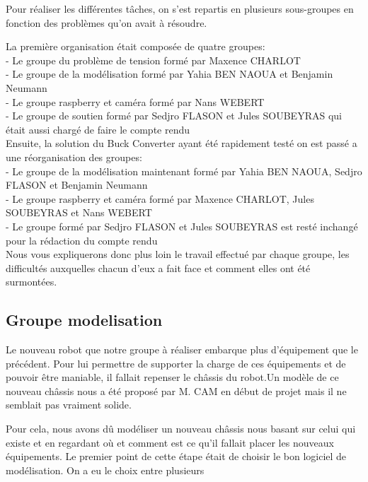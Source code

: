 \documentclass{PackagerQualityN}
\begin{document}
Pour réaliser les différentes tâches, on s'est repartis en plusieurs sous-groupes en fonction des problèmes qu'on avait à résoudre.

La première organisation était composée de quatre groupes:\\
- Le groupe du problème de tension formé par Maxence CHARLOT\\
- Le groupe de la modélisation formé par Yahia BEN NAOUA et Benjamin Neumann\\
- Le groupe raspberry et caméra formé par Nans WEBERT\\
- Le groupe de soutien formé par Sedjro FLASON et Jules SOUBEYRAS qui était aussi chargé de faire le compte rendu\\

Ensuite, la solution du Buck Converter ayant été rapidement testé on est passé a une réorganisation des groupes:\\
- Le groupe de la modélisation maintenant formé par Yahia BEN NAOUA, Sedjro FLASON et Benjamin Neumann\\
- Le groupe raspberry et caméra formé par Maxence CHARLOT, Jules SOUBEYRAS et Nans WEBERT\\
- Le groupe formé par Sedjro FLASON et Jules SOUBEYRAS est resté inchangé pour la rédaction du compte rendu\\

Nous vous expliquerons donc plus loin le travail effectué par chaque groupe, les difficultés auxquelles chacun d'eux a fait face et comment elles ont été surmontées.

\subsection{Groupe modelisation}

Le nouveau robot que notre groupe à réaliser embarque plus d'équipement que le précédent. Pour lui permettre de supporter la charge de ces équipements et de pouvoir être maniable, il fallait repenser le châssis du robot.Un modèle de ce nouveau châssis nous a été proposé par M. CAM en début de projet mais il ne semblait pas vraiment solide.

\vspace{0.5cm}
\vspace{0.5cm}

Pour cela, nous avons dû modéliser un nouveau châssis nous basant sur celui qui existe et en regardant où et comment est ce qu'il fallait placer les nouveaux équipements.
Le premier point de cette étape était de choisir le bon logiciel de modélisation. On a eu le choix entre plusieurs
\end{document}
